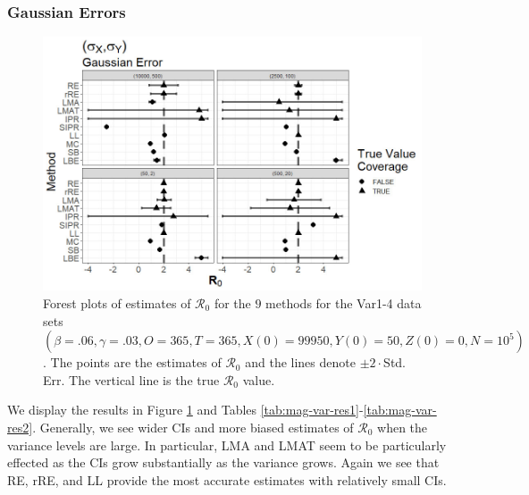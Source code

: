 \documentclass[12pt]{article}
\newcommand{\xxsir}{\ensuremath{9} } %
\newcommand{\rr}{\ensuremath{\mathcal{R}_0}}
\begin{document}
\subsubsection{Gaussian Errors}

\begin{figure}[H]
\begin{center}
  \includegraphics[scale=0.5]{images/var_n.jpg}
  \caption{Forest plots of estimates of $\rr$ for the \xxsir methods for the Var1-4 data sets $(\beta=.06, \gamma=.03, O=365, T=365, X(0)=99950, Y(0)=50, Z(0)=0, N=10^5)$.  The points are the estimates of $\rr$ and the lines denote $\pm 2\cdot $Std. Err.  The vertical line is the true $\rr$ value.}
  \label{fig:mag-var-res}
\end{center}
\end{figure}

We display the results in Figure \ref{fig:mag-var-res} and Tables \ref{tab:mag-var-res1}-\ref{tab:mag-var-res2}.  Generally, we see wider CIs and more biased estimates of $\rr$ when the variance levels are large.  In particular, LMA and LMAT seem to be particularly effected as the CIs grow substantially as the variance grows.  Again we see that RE, rRE, and LL provide the most accurate estimates with relatively small CIs.
\end{document}
